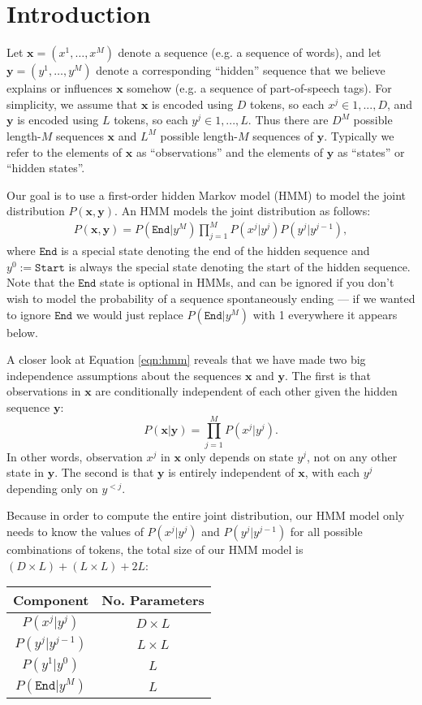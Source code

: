 \documentclass{article}
\newcommand{\x}{\textbf{x}}
\newcommand{\y}{\textbf{y}}
\newcommand{\END}{\texttt{End}}
\newcommand{\START}{\texttt{Start}}
\begin{document}
\pagestyle{fancy}

\section{Introduction}

Let $\x = (x^1,\ldots,x^M)$ denote a sequence (e.g. a sequence of words), and let $\y = (y^1,\ldots,y^M)$ denote a corresponding ``hidden'' sequence that we believe explains or influences $\x$ somehow (e.g. a sequence of part-of-speech tags).  For simplicity, we assume that $\x$ is encoded using $D$ tokens, so each $x^j \in 1, ..., D$, and $\y$ is encoded using $L$ tokens, so each $y^j \in 1, ..., L$.  Thus there are $D^M$ possible length-$M$ sequences $\x$ and $L^M$ possible length-$M$ sequences of $\y$.  Typically we refer to the elements of $\x$ as ``observations'' and the elements of $\y$ as ``states'' or ``hidden states''.

Our goal is to use a first-order hidden Markov model (HMM) to model the joint distribution $P(\x,\y)$.   An HMM models the joint distribution as follows:
\begin{eqnarray}P(\x,\y) = P(\END|y^M)\prod_{j=1}^{M}P(x^j|y^j)P(y^j|y^{j-1}),\label{eqn:hmm}\end{eqnarray}
where $\END$ is a special state denoting the end of the hidden sequence and $y^0 := \START$ is always the special state denoting the start of the hidden sequence.  Note that the $\END$ state is optional in HMMs, and can be ignored if you don't wish to model the probability of a sequence spontaneously ending --- if we wanted to ignore $\END$ we would just replace $P(\END|y^M)$ with 1 everywhere it appears below.

A closer look at Equation \ref{eqn:hmm} reveals that we have made two big independence assumptions about the sequences $\x$ and $\y$.  The first is that observations in $\x$ are conditionally independent of each other given the hidden sequence $\y$:
$$P(\x|\y) = \prod_{j=1}^MP(x^j|y^j).$$
In other words, observation $x^j$ in $\x$ only depends on state $y^j$, not on any other state in $\y$.  The second is that $\y$ is entirely independent of $\x$, with each $y^j$ depending only on $y^{<j}$.

Because in order to compute the entire joint distribution, our HMM model only needs to know the values of $P(x^j|y^j)$ and $P(y^j|y^{j-1})$ for all possible combinations of tokens, the total size of our HMM model is $(D \times L) + (L \times L) + 2L$:

\begin{center}
\begin{tabular}{|c|c|}
\hline
Component & No. Parameters\\
\hline
$P(x^j|y^j)$ & $D\times L$\\
$P(y^j|y^{j-1})$ & $L\times L$\\
$P(y^1|y^0)$ & $L$\\
$P(\END|y^M)$ & $L$\\
\hline
\end{tabular}
\end{center}
\end{document}
